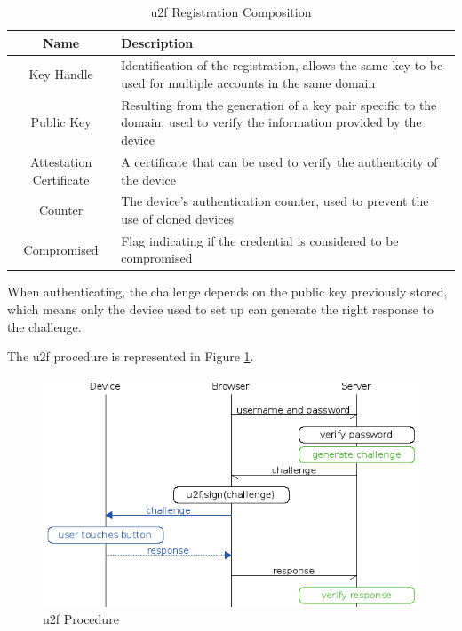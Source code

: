 \begin{table}[ht]
  \begin{tabularx}{\textwidth}{@{}|c| *1{>{\centering\arraybackslash}X}@{}|}
    \hline
    \textbf{Name} & \textbf{Description} \\
    \hline\hline
    Key Handle & Identification of the registration, allows the same key to be used for multiple accounts in the same domain  \\
    \hline
    Public Key & Resulting from the generation of a key pair specific to the domain, used to verify the information provided by the device \\
    \hline
    Attestation Certificate & A certificate that can be used to verify the authenticity of the device \\
    \hline
    Counter & The device's authentication counter, used to prevent the use of cloned devices \\
    \hline
    Compromised & Flag indicating if the credential is considered to be compromised \\
    \hline
  \end{tabularx}
  \caption{\acrshort{u2f} Registration Composition}
  \label{tab:u2f}
\end{table}

When authenticating, the challenge depends on the public key previously stored, which means only the device used to set up can generate the right response to the challenge.

The \acrshort{u2f} procedure is represented in Figure \ref{fig:yubi}.

\begin{figure}[ht]
 \centering
 \includegraphics[width=0.9\linewidth]{imgs/yubi.png}
 \caption{\acrshort{u2f} Procedure \cite{yubi}}
 \label{fig:yubi}
\end{figure}

